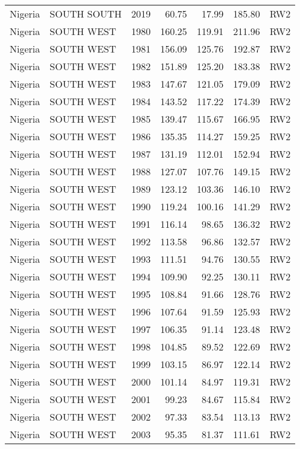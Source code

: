 \begin{longtable}{lllrrrl}
  Nigeria & SOUTH SOUTH & 2019 & 60.75 & 17.99 & 185.80 & RW2 \\ 
  Nigeria & SOUTH WEST & 1980 & 160.25 & 119.91 & 211.96 & RW2 \\ 
  Nigeria & SOUTH WEST & 1981 & 156.09 & 125.76 & 192.87 & RW2 \\ 
  Nigeria & SOUTH WEST & 1982 & 151.89 & 125.20 & 183.38 & RW2 \\ 
  Nigeria & SOUTH WEST & 1983 & 147.67 & 121.05 & 179.09 & RW2 \\ 
  Nigeria & SOUTH WEST & 1984 & 143.52 & 117.22 & 174.39 & RW2 \\ 
  Nigeria & SOUTH WEST & 1985 & 139.47 & 115.67 & 166.95 & RW2 \\ 
  Nigeria & SOUTH WEST & 1986 & 135.35 & 114.27 & 159.25 & RW2 \\ 
  Nigeria & SOUTH WEST & 1987 & 131.19 & 112.01 & 152.94 & RW2 \\ 
  Nigeria & SOUTH WEST & 1988 & 127.07 & 107.76 & 149.15 & RW2 \\ 
  Nigeria & SOUTH WEST & 1989 & 123.12 & 103.36 & 146.10 & RW2 \\ 
  Nigeria & SOUTH WEST & 1990 & 119.24 & 100.16 & 141.29 & RW2 \\ 
  Nigeria & SOUTH WEST & 1991 & 116.14 & 98.65 & 136.32 & RW2 \\ 
  Nigeria & SOUTH WEST & 1992 & 113.58 & 96.86 & 132.57 & RW2 \\ 
  Nigeria & SOUTH WEST & 1993 & 111.51 & 94.76 & 130.55 & RW2 \\ 
  Nigeria & SOUTH WEST & 1994 & 109.90 & 92.25 & 130.11 & RW2 \\ 
  Nigeria & SOUTH WEST & 1995 & 108.84 & 91.66 & 128.76 & RW2 \\ 
  Nigeria & SOUTH WEST & 1996 & 107.64 & 91.59 & 125.93 & RW2 \\ 
  Nigeria & SOUTH WEST & 1997 & 106.35 & 91.14 & 123.48 & RW2 \\ 
  Nigeria & SOUTH WEST & 1998 & 104.85 & 89.52 & 122.69 & RW2 \\ 
  Nigeria & SOUTH WEST & 1999 & 103.15 & 86.97 & 122.14 & RW2 \\ 
  Nigeria & SOUTH WEST & 2000 & 101.14 & 84.97 & 119.31 & RW2 \\ 
  Nigeria & SOUTH WEST & 2001 & 99.23 & 84.67 & 115.84 & RW2 \\ 
  Nigeria & SOUTH WEST & 2002 & 97.33 & 83.54 & 113.13 & RW2 \\ 
  Nigeria & SOUTH WEST & 2003 & 95.35 & 81.37 & 111.61 & RW2 \\ 

\end{longtable}
